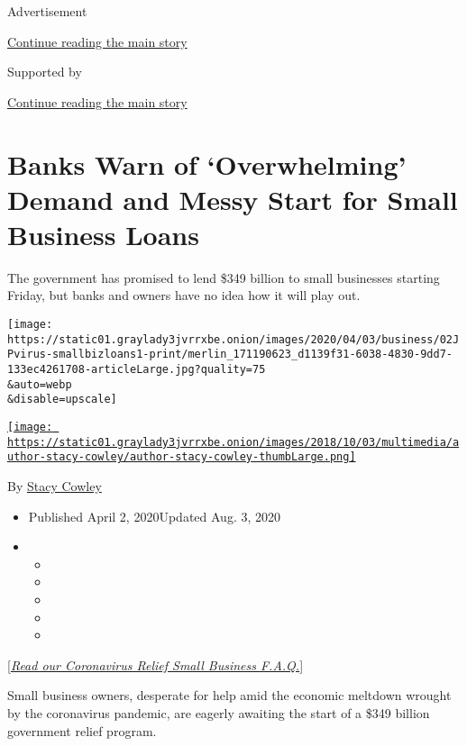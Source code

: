 Advertisement

\protect\hyperlink{after-top}{Continue reading the main story}

Supported by

\protect\hyperlink{after-sponsor}{Continue reading the main story}

\hypertarget{banks-warn-of-overwhelming-demand-and-messy-start-for-small-business-loans}{%
\section{Banks Warn of `Overwhelming' Demand and Messy Start for Small
Business
Loans}\label{banks-warn-of-overwhelming-demand-and-messy-start-for-small-business-loans}}

The government has promised to lend \$349 billion to small businesses
starting Friday, but banks and owners have no idea how it will play out.

\texttt{[image: https://static01.graylady3jvrrxbe.onion/images/2020/04/03/business/02JPvirus-smallbizloans1-print/merlin\_171190623\_d1139f31-6038-4830-9dd7-133ec4261708-articleLarge.jpg?quality=75\\\&auto=webp\\\&disable=upscale]}

\href{https://www.nytimes3xbfgragh.onion/by/stacy-cowley}{\texttt{[image: https://static01.graylady3jvrrxbe.onion/images/2018/10/03/multimedia/author-stacy-cowley/author-stacy-cowley-thumbLarge.png]}}

By \href{https://www.nytimes3xbfgragh.onion/by/stacy-cowley}{Stacy
Cowley}

\begin{itemize}
\item
  Published April 2, 2020Updated Aug. 3, 2020
\item
  \begin{itemize}
  \item
  \item
  \item
  \item
  \item
  \end{itemize}
\end{itemize}

{[}\href{https://www.nytimes3xbfgragh.onion/article/small-business-loans-stimulus-grants-freelancers-coronavirus.html}{\emph{Read
our Coronavirus Relief Small Business F.A.Q.}}{]}

Small business owners, desperate for help amid the economic meltdown
wrought by the coronavirus pandemic, are eagerly awaiting the start of a
\$349 billion government relief program.

